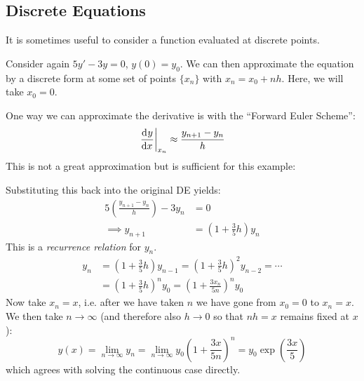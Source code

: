 \documentclass[../main.tex]{subfiles}
\begin{document}
\subsection{Discrete Equations}
It is sometimes useful to consider a function evaluated at discrete points.
\begin{example}
  Consider again $5y' - 3y = 0$, $y(0) = y_0$.
  We can then approximate the equation by a discrete form at some set of points $\{x_n\}$ with $x_n = x_0 + nh$.
  Here, we will take $x_0 = 0$.

  One way we can approximate the derivative is with the ``Forward Euler Scheme'':
  \[
    \at{\deriv{y}{x}}{x_n} \approx \frac{y_{n+1} - y_n}{h}
  \]
  This is not a great approximation but is sufficient for this example:
  \begin{center}
  \end{center}
  Substituting this back into the original DE yields:
  \begin{align*}
    5\left(\frac{y_{n+1}-y_n}{h}\right) - 3y_n &= 0 \\
    \implies y_{n+1} &= \left(1 + \frac{3}{5}h\right)y_n
  \end{align*}
  This is a \textit{recurrence relation} for $y_n$.
  \begin{align*}
    y_n &= \left(1 + \frac{3}{5}h\right)y_{n-1} = \left(1 + \frac{3}{5}h\right)^2 y_{n - 2} = \cdots \\
        &= \left(1 + \frac{3}{5}h\right)^{n}y_0 = \left(1 + \frac{3x_n}{5n}\right)^{n}y_0
  \end{align*}
  Now take $x_n = x$, i.e. after we have taken $n$ we have gone from $x_0 = 0$ to $x_n = x$.
  We then take $n \to \infty$ (and therefore also $h \to 0$ so that $nh = x$ remains fixed at $x$):
  \[
    y(x) = \lim_{n \to \infty} y_n = \lim_{n \to \infty} y_0 \left(1 + \frac{3x}{5n}\right)^{n} = y_0 \exp\left(\frac{3x}{5}\right)
  \]
  which agrees with solving the continuous case directly.
\end{example}
\end{document}
